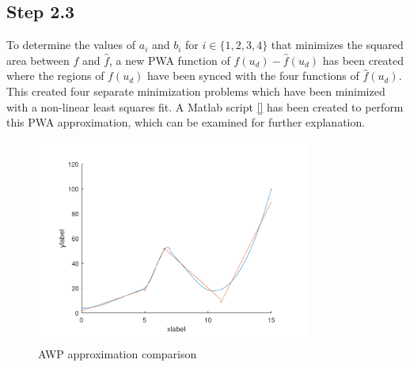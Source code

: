 \subsection*{Step 2.3}

To determine the values of $a_i$ and $b_i$ for $i \in \{1,2,3,4\}$ that minimizes the squared area between $f$ and $\hat{f}$, a new PWA function of $f(u_d)-\hat{f}(u_d)$ has been created where the regions of $f(u_d)$ have been synced with the four functions of $\hat{f}(u_d)$. This created four separate minimization problems which have been minimized with a non-linear least squares fit. A Matlab script \ref{} has been created to perform this PWA approximation, which can be examined for further explanation.

\begin{figure}[ht]
    \centering
    \includegraphics[width=0.8\textwidth]{Latex/images/part23Sym.pdf}
    \caption{AWP approximation comparison}
    \label{fig:part23}
\end{figure}
